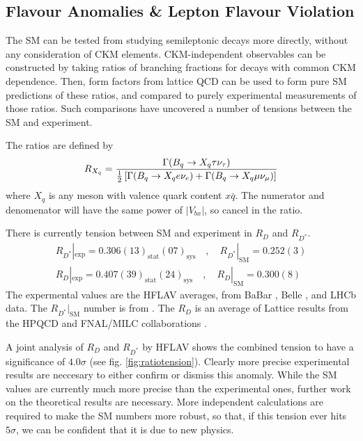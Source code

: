 \subsection{Flavour Anomalies \& Lepton Flavour Violation}

The SM can be tested from studying semileptonic decays more directly, without any consideration of CKM elements. CKM-independent observables can be constructed by taking ratios of branching fractions for decays with common CKM dependence. Then, form factors from lattice QCD can be used to form pure SM predictions of these ratios, and compared to purely experimental measurements of those ratios. Such comparisons have uncovered a number of tensions between the SM and experiment.

The ratios are defined by
\begin{align}
	R_{X_q} = {\Gamma(B_q\to X_q \tau \nu_{\tau}) \over {1\over 2}\left[\Gamma(B_q\to X_q e \nu_e) + \Gamma(B_q\to X_q \mu \nu_{\mu}) \right]}
\end{align}
where $X_q$ is any meson with valence quark content $x\bar{q}$. The numerator and denomenator will have the same power of $|V_{bx}|$, so cancel in the ratio.

There is currently tension between SM and experiment in $R_D$ and $R_{D^*}$.
\begin{gather}
  R_{D^*}|_{\text{exp}} = 0.306(13)_{\text{stat}}(07)_{\text{sys}}\quad,\quad R_{D^*}|_{\text{SM}} = 0.252(3)
  \\
  R_D|_{\text{exp}} = 0.407(39)_{\text{stat}}(24)_{\text{sys}}\quad,\quad R_D|_{\text{SM}} = 0.300(8)
\end{gather}
The expermental values are the HFLAV averages, from BaBar \cite{Lees:2012xj,Lees:2013uzd}, Belle \cite{Huschle:2015rga,Sato:2016svk,Hirose:2016wfn,Hirose:2017dxl}, and LHCb \cite{Aaij:2015yra,Aaij:2017uff,Aaij:2017deq} data. The $R_{D^*}|_{\text{SM}}$ number is from \cite{Fajfer:2012vx}. The $R_D$ is an average of Lattice results from the HPQCD \cite{Na:2015kha} and FNAL/MILC collaborations \cite{Lattice:2015rga}.

A joint analysis of $R_D$ and $R_{D^*}$ by HFLAV shows the combined tension to have a significance of $4.0\sigma$ (see fig. \ref{fig:ratiotension}). Clearly more precise experimental results are neccesary to either confirm or dismiss this anomaly. While the SM values are currently much more precise than the experimental ones, further work on the theoretical results are necessary. More independent calculations are required to make the SM numbers more robust, so that, if this tension ever hits $5\sigma$, we can be confident that it is due to new physics.

